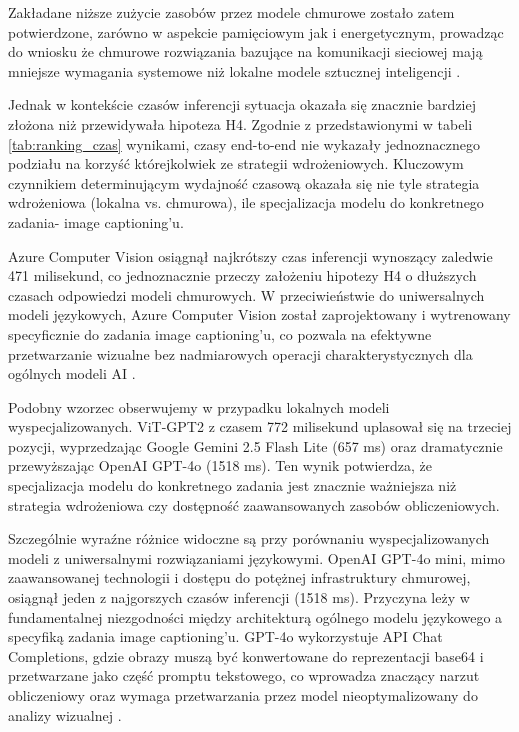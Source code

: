 Zakładane niższe zużycie zasobów przez modele chmurowe zostało zatem potwierdzone, zarówno w aspekcie pamięciowym jak i energetycznym, prowadząc do wniosku że chmurowe rozwiązania
bazujące na komunikacji sieciowej mają mniejsze wymagania systemowe niż lokalne modele sztucznej inteligencji \cite{mobile_energy_pathak2012}.

Jednak w kontekście czasów inferencji sytuacja okazała się znacznie bardziej złożona niż przewidywała hipoteza H4. Zgodnie z przedstawionymi w tabeli \ref{tab:ranking_czas} wynikami,
czasy end-to-end nie wykazały jednoznacznego podziału na korzyść którejkolwiek ze strategii wdrożeniowych. Kluczowym czynnikiem determinującym wydajność czasową
okazała się nie tyle strategia wdrożeniowa (lokalna vs. chmurowa), ile specjalizacja modelu do konkretnego zadania- image captioning'u.

Azure Computer Vision osiągnął najkrótszy czas inferencji wynoszący zaledwie 471 milisekund, co jednoznacznie przeczy założeniu hipotezy H4 
o dłuższych czasach odpowiedzi modeli chmurowych.
W przeciwieństwie do uniwersalnych modeli językowych, Azure Computer Vision został zaprojektowany i wytrenowany specyficznie do zadania image captioning'u,
co pozwala na efektywne przetwarzanie wizualne bez nadmiarowych operacji charakterystycznych dla ogólnych modeli AI \cite{azurecv_florence}.

Podobny wzorzec obserwujemy w przypadku lokalnych modeli wyspecjalizowanych. ViT-GPT2 z czasem 772 milisekund uplasował się na trzeciej pozycji,
wyprzedzając Google Gemini 2.5 Flash Lite (657 ms) oraz dramatycznie przewyższając OpenAI GPT-4o (1518 ms). Ten wynik potwierdza, że specjalizacja modelu
do konkretnego zadania jest znacznie ważniejsza niż strategia wdrożeniowa czy dostępność zaawansowanych zasobów obliczeniowych.

Szczególnie wyraźne różnice widoczne są przy porównaniu wyspecjalizowanych modeli z uniwersalnymi rozwiązaniami językowymi.
OpenAI GPT-4o mini, mimo zaawansowanej technologii i dostępu do potężnej infrastruktury chmurowej, osiągnął jeden z najgorszych czasów inferencji (1518 ms).
Przyczyna leży w fundamentalnej niezgodności między architekturą ogólnego modelu językowego a specyfiką zadania image captioning'u.
GPT-4o wykorzystuje API Chat Completions, gdzie obrazy muszą być konwertowane do reprezentacji base64 i przetwarzane jako część promptu tekstowego,
co wprowadza znaczący narzut obliczeniowy oraz wymaga przetwarzania przez model nieoptymalizowany do analizy wizualnej \cite{openai_completions2025}.

